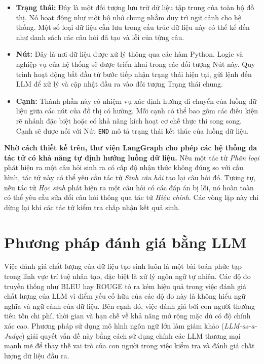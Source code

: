 \begin{itemize}
    \item \textbf{Trạng thái:} Đây là một đối tượng lưu trữ dữ liệu tập trung của toàn bộ đồ thị. Nó hoạt động như một bộ nhớ chung nhằm duy trì ngữ cảnh cho hệ thống. Một số loại dữ liệu cần lưu trong cấu trúc dữ liệu này có thể kể đến như danh sách các câu hỏi đã tạo và lỗi của từng câu.

    \item \textbf{Nút:} Đây là nơi dữ liệu được xử lý thông qua các hàm Python. Logic và nghiệp vụ của hệ thống sẽ được triển khai trong các đối tượng Nút này. Quy trình hoạt động bắt đầu từ bước tiếp nhận trạng thái hiện tại, gửi lệnh đến LLM để xử lý và cập nhật đầu ra vào đối tượng Trạng thái chung.

    \item \textbf{Cạnh:} Thành phần này có nhiệm vụ xác định hướng di chuyển của luồng dữ liệu giữa các nút của đồ thị có hướng. Mỗi cạnh có thể bao gồm các điều kiện rẽ nhánh đặc biệt hoặc có khả năng kích hoạt cơ chế thực thi song song. Cạnh sẽ được nối với Nút \texttt{END} mô tả trạng thái kết thúc của luồng dữ liệu.
\end{itemize}

\textbf{Nhờ cách thiết kế trên, thư viện LangGraph cho phép các hệ thống đa tác tử có khả năng tự định hướng luồng dữ liệu.} Nếu một tác tử \textit{Phân loại} phát hiện ra một câu hỏi sinh ra có cấp độ nhận thức không đúng so với cấu hình, tác tử này có thể yêu cầu tác tử \textit{Sinh câu hỏi} tạo lại câu hỏi đó. Tương tự, nếu tác tử \textit{Học sinh} phát hiện ra một câu hỏi có các đáp án bị lỗi, nó hoàn toàn có thể yêu cầu sửa đổi câu hỏi thông qua tác tử \textit{Hiệu chỉnh}. Các vòng lặp này chỉ dừng lại khi các tác tử kiểm tra chấp nhận kết quả sinh.

\section{Phương pháp đánh giá bằng LLM}

Việc đánh giá chất lượng của dữ liệu tạo sinh luôn là một bài toán phức tạp trong lĩnh vực trí tuệ nhân tạo, đặc biệt là xử lý ngôn ngữ tự nhiên. Các độ đo truyền thống như BLEU hay ROUGE tỏ ra kém hiệu quả trong việc đánh giá chất lượng của LLM vì điểm yếu cố hữu của các độ đo này là không hiểu ngữ nghĩa và ngữ cảnh của dữ liệu. Bên cạnh đó, việc đánh giá bởi con người thường tiêu tốn chi phí, thời gian và hạn chế về khả năng mở rộng mặc dù có độ chính xác cao. Phương pháp sử dụng mô hình ngôn ngữ lớn làm giám khảo (\textit{LLM-as-a-Judge}) giải quyết vấn đề này bằng cách sử dụng chính các LLM thương mại mạnh mẽ để thay thế vai trò của con người trong việc kiểm tra và đánh giá chất lượng dữ liệu đầu ra.

